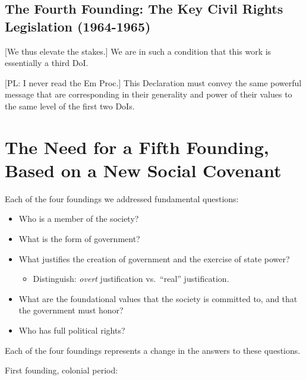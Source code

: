 \documentclass[
]{book}
\providecommand{\tightlist}{%
  \setlength{\itemsep}{0pt}\setlength{\parskip}{0pt}}
\begin{document}
\hypertarget{the-fourth-founding-the-key-civil-rights-legislation-1964-1965}{%
\subsection{The Fourth Founding: The Key Civil Rights Legislation (1964-1965)}\label{the-fourth-founding-the-key-civil-rights-legislation-1964-1965}}

{[}We thus elevate the stakes.{]} We are in such a condition that this work is essentially a third DoI.

{[}PL: I never read the Em Proc.{]} This Declaration must convey the same powerful message that are corresponding in their generality and power of their values to the same level of the first two DoIs.

\hypertarget{the-need-for-a-fifth-founding-based-on-a-new-social-covenant}{%
\section{The Need for a Fifth Founding, Based on a New Social Covenant}\label{the-need-for-a-fifth-founding-based-on-a-new-social-covenant}}

Each of the four foundings we addressed fundamental questions:

\begin{itemize}
\tightlist
\item
  Who is a member of the society?
\item
  What is the form of government?
\item
  What justifies the creation of government and the exercise of state power?

  \begin{itemize}
  \tightlist
  \item
    Distinguish: \emph{overt} justification vs.~``real'' justification.
  \end{itemize}
\item
  What are the foundational values that the society is committed to, and that the government must honor?
\item
  Who has full political rights?
\end{itemize}

Each of the four foundings represents a change in the answers to these questions.

First founding, colonial period:
\end{document}
